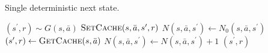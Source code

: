 %
\begin{algorithm}[!ht]
  \captionsetup{font=small}
  \small
  \caption{Single deterministic next state.}
  \label{alg:mcts-pw-deterministic-state}
  \begin{algorithmic}
    \State $(s^\prime, r) \sim G(s,\bar{a})$
    \State $\textproc{SetCache}(s, \bar{a}, s^\prime, r)$
    \State $N(s,\bar{a},s^\prime) \leftarrow N_0(s,\bar{a},s^\prime)$
  \Else
    \State $(s^\prime, r) \leftarrow \textproc{GetCache}(s,\bar{a})$
    \State $N(s,\bar{a},s^\prime) \leftarrow N(s,\bar{a},s^\prime)+1$
  \EndIf
  \State \Return $(s^\prime,r)$
  \EndFunction
  \end{algorithmic}
\end{algorithm}

